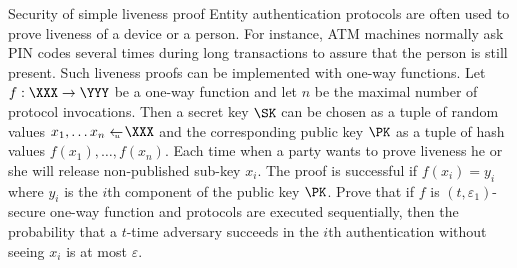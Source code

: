 \documentclass{crypto-exercise}
\author{Sven Laur}
\begin{document}
\begin{exercise}{Security of simple liveness proof}
Entity authentication protocols are often used to prove liveness of a device or a person. For instance, ATM machines normally ask PIN codes several times during long transactions to assure that the person is still present. Such liveness proofs can be implemented with one-way functions. Let $f:\XXX\to\YYY$ be a one-way function and let $n$ be the maximal number of protocol invocations. Then a secret key $\SK$ can be chosen as a tuple of random values $x_{1},\ldots x_{n}\getsu \XXX$ and the corresponding public key $\PK$ as a tuple of hash values $f(x_1),\ldots,f(x_n)$. Each time when a party wants to prove liveness he or she will release non-published sub-key $x_i$.  The proof is successful if $f(x_i)=y_i$ where $y_i$ is the $i$th component of the public key $\PK$. Prove that if $f$ is $(t,\varepsilon_1)$-secure one-way function and protocols are executed sequentially, then the probability that a $t$-time adversary succeeds in the $i$th authentication without seeing $x_i$ is at most $\varepsilon$.
\end{exercise}
\end{document}
